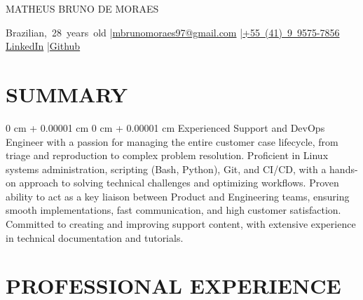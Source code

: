 \documentclass[10pt, letterpaper]{article}
\newenvironment{onecolentry}{
    \begin{adjustwidth}{
        0 cm + 0.00001 cm
    }{
        0 cm + 0.00001 cm
    }
}{
    \end{adjustwidth}
}
\newenvironment{header}{
    \setlength{\topsep}{0pt}\par\kern\topsep\centering\linespread{1.5}
}{
    \par\kern\topsep
}
\begin{document}
\begin{header}
    {\fontsize{25pt}{25pt}\selectfont MATHEUS BRUNO DE MORAES}

    \vspace{0pt}

    \normalsize
    \mbox{Brazilian, 28 years old} \enskip|\enskip \mbox{\href{mailto:mbrunomoraes97@gmail.com}{mbrunomoraes97@gmail.com}} \enskip|\enskip \mbox{\href{tel:+55(41)995757856}{+55 (41) 9 9575-7856}} \\
    \mbox{\href{https://www.linkedin.com/in/brunomoraes97/}{LinkedIn}} \enskip|\enskip \mbox{\href{https://github.com/brunomoraes97}{Github}}
\end{header}

\vspace{5pt - 0.1cm}

\section{SUMMARY}
\begin{onecolentry}{Experienced Support and DevOps Engineer with a passion for managing the entire customer case lifecycle, from triage and reproduction to complex problem resolution. Proficient in Linux systems administration, scripting (Bash, Python), Git, and CI/CD, with a hands-on approach to solving technical challenges and optimizing workflows. Proven ability to act as a key liaison between Product and Engineering teams, ensuring smooth implementations, fast communication, and high customer satisfaction. Committed to creating and improving support content, with extensive experience in technical documentation and tutorials.}\end{onecolentry}
\section{PROFESSIONAL EXPERIENCE}
\end{document}
